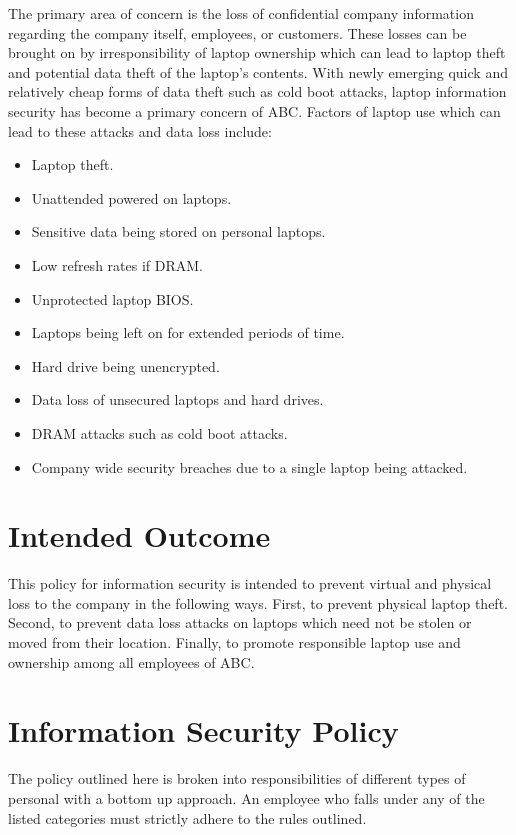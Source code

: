 \documentclass[DIV=calc, paper=a4, fontsize=11pt, twocolumn]{scrartcl}	 %
\begin{document}
The primary area of concern is the loss of confidential company information
regarding the company itself, employees, or customers. These losses can be
brought on by irresponsibility of laptop ownership which can lead to laptop
theft and potential data theft of the laptop's contents. With newly emerging
quick and relatively cheap forms of data theft such as cold boot 
attacks, laptop
information security has become a primary concern of ABC. Factors of laptop
use which can lead to these attacks and data loss include:
\begin{itemize}
\item Laptop theft.
\item Unattended powered on laptops.
\item Sensitive data being stored on personal laptops.
\item Low refresh rates if DRAM.
\item Unprotected laptop BIOS.
\item Laptops being left on for extended periods of time.
\item Hard drive being unencrypted.
\item Data loss of unsecured laptops and hard drives.
\item DRAM attacks such as cold boot attacks.
\item Company wide security breaches due to a single laptop being attacked.
\end{itemize}


\section*{Intended Outcome}

This policy for information security is intended to prevent virtual and 
physical
loss to the company in the following ways. First, to prevent physical laptop
theft. Second, to prevent data loss attacks on laptops which need not be stolen
or moved from their location. Finally, to promote responsible laptop use
and ownership among all employees of ABC.


\section*{Information Security Policy}

The policy outlined here is broken into responsibilities of different types of
personal with a bottom up approach. An employee who falls under any of the listed
categories must strictly adhere to the rules outlined.
\end{document}
